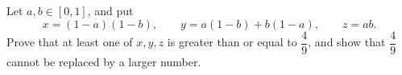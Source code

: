 Let $a,b\in[0,1]$, and put
\[x=(1-a)(1-b),\qquad y=a(1-b)+b(1-a),\qquad z=ab.\]
Prove that at least one of $x,y,z$ is greater than or equal to $\dfrac49$, and show that $\dfrac49$ cannot be replaced by a larger number.
